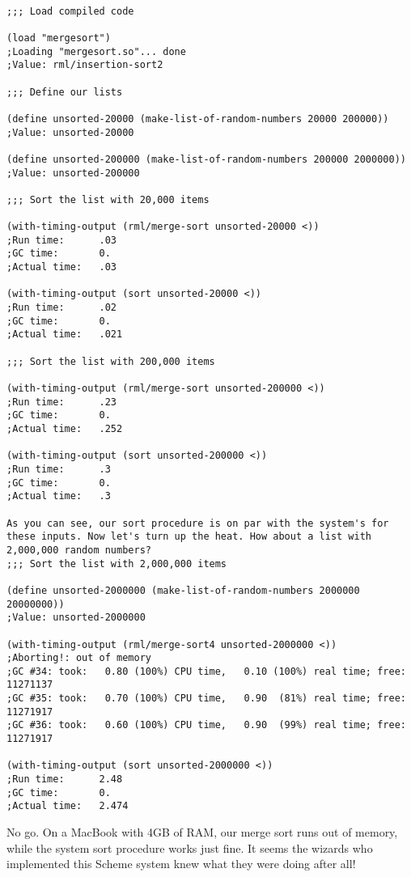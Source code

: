 \documentclass[12pt,openright,draft]{book}
\begin{document}
\begin{verbatim}

;;; Load compiled code

(load "mergesort")
;Loading "mergesort.so"... done
;Value: rml/insertion-sort2

;;; Define our lists

(define unsorted-20000 (make-list-of-random-numbers 20000 200000))
;Value: unsorted-20000

(define unsorted-200000 (make-list-of-random-numbers 200000 2000000))
;Value: unsorted-200000

;;; Sort the list with 20,000 items

(with-timing-output (rml/merge-sort unsorted-20000 <))
;Run time:      .03
;GC time:       0.
;Actual time:   .03

(with-timing-output (sort unsorted-20000 <))
;Run time:      .02
;GC time:       0.
;Actual time:   .021

;;; Sort the list with 200,000 items

(with-timing-output (rml/merge-sort unsorted-200000 <))
;Run time:      .23
;GC time:       0.
;Actual time:   .252

(with-timing-output (sort unsorted-200000 <))
;Run time:      .3
;GC time:       0.
;Actual time:   .3

As you can see, our sort procedure is on par with the system's for these inputs. Now let's turn up the heat. How about a list with 2,000,000 random numbers?
;;; Sort the list with 2,000,000 items

(define unsorted-2000000 (make-list-of-random-numbers 2000000 20000000))
;Value: unsorted-2000000

(with-timing-output (rml/merge-sort4 unsorted-2000000 <))
;Aborting!: out of memory
;GC #34: took:   0.80 (100%) CPU time,   0.10 (100%) real time; free: 11271137
;GC #35: took:   0.70 (100%) CPU time,   0.90  (81%) real time; free: 11271917
;GC #36: took:   0.60 (100%) CPU time,   0.90  (99%) real time; free: 11271917

(with-timing-output (sort unsorted-2000000 <))
;Run time:      2.48
;GC time:       0.
;Actual time:   2.474

\end{verbatim}

No go. On a MacBook with 4GB of RAM, our merge sort runs out of
memory, while the system sort procedure works just fine. It seems the
wizards who implemented this Scheme system knew what they were doing
after all!
\end{document}
